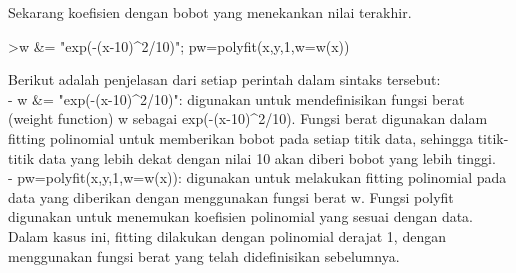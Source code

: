 \documentclass[a4paper,10pt]{article}
\begin{document}
\begin{eulernotebook}
\begin{eulercomment}
\begin{eulercomment}
\begin{eulercomment}
\begin{eulercomment}
\begin{eulercomment}
\begin{eulercomment}
\begin{eulercomment}
\begin{eulercomment}
\begin{eulercomment}
\begin{eulercomment}
\begin{eulercomment}
\begin{eulercomment}
\begin{eulercomment}
\begin{eulercomment}
\begin{eulercomment}
\begin{eulercomment}
\begin{eulercomment}
\begin{eulercomment}
\begin{eulercomment}
Sekarang koefisien dengan bobot yang menekankan nilai terakhir.
\end{eulercomment}
\begin{eulerprompt}
>w &= "exp(-(x-10)^2/10)"; pw=polyfit(x,y,1,w=w(x))
\end{eulerprompt}
\begin{euleroutput}
  [4.71566,  0.38319]
\end{euleroutput}
\begin{eulercomment}
Berikut adalah penjelasan dari setiap perintah dalam sintaks tersebut:\\
- w \&= "exp(-(x-10)\textasciicircum{}2/10)": digunakan untuk mendefinisikan fungsi
berat (weight function) w sebagai exp(-(x-10)\textasciicircum{}2/10). Fungsi berat
digunakan dalam fitting polinomial untuk memberikan bobot pada setiap
titik data, sehingga titik-titik data yang lebih dekat dengan nilai 10
akan diberi bobot yang lebih tinggi.\\
- pw=polyfit(x,y,1,w=w(x)): digunakan untuk melakukan fitting
polinomial pada data yang diberikan dengan menggunakan fungsi berat w.
Fungsi polyfit digunakan untuk menemukan koefisien polinomial yang
sesuai dengan data. Dalam kasus ini, fitting dilakukan dengan
polinomial derajat 1, dengan menggunakan fungsi berat yang telah
didefinisikan sebelumnya.


\end{eulercomment}
\end{eulercomment}
\end{eulercomment}
\end{eulercomment}
\end{eulercomment}
\end{eulercomment}
\end{eulercomment}
\end{eulercomment}
\end{eulercomment}
\end{eulercomment}
\end{eulercomment}
\end{eulercomment}
\end{eulercomment}
\end{eulercomment}
\end{eulercomment}
\end{eulercomment}
\end{eulercomment}
\end{eulercomment}
\end{eulercomment}
\end{eulernotebook}
\end{document}
